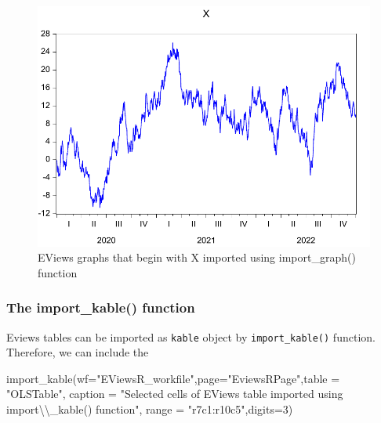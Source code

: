 \documentclass[
  letterpaper,
  DIV=11,
  numbers=noendperiod]{scrartcl}
\newenvironment{Shaded}{\begin{snugshade}}{\end{snugshade}}
\newcommand{\AttributeTok}[1]{\textcolor[rgb]{0.40,0.45,0.13}{#1}}
\newcommand{\DecValTok}[1]{\textcolor[rgb]{0.68,0.00,0.00}{#1}}
\newcommand{\FunctionTok}[1]{\textcolor[rgb]{0.28,0.35,0.67}{#1}}
\newcommand{\NormalTok}[1]{\textcolor[rgb]{0.00,0.23,0.31}{#1}}
\newcommand{\SpecialCharTok}[1]{\textcolor[rgb]{0.37,0.37,0.37}{#1}}
\newcommand{\StringTok}[1]{\textcolor[rgb]{0.13,0.47,0.30}{#1}}
\begin{document}
\begin{figure}
\begin{minipage}[t]{0.50\linewidth}
{{\includegraphics{README_files/figure-pdf//fig-importGraph1-eviewspage1-X_GRAPH.pdf}

}

\caption{\label{fig-importGraph1-2}EViews graphs that begin with X
imported using import\_graph() function}

}

\end{minipage}%

\end{figure}

\hypertarget{the-import_kable-function}{%
\subsubsection{The import\_kable()
function}\label{the-import_kable-function}}

Eviews tables can be imported as \texttt{kable} object by
\texttt{import\_kable()} function. Therefore, we can include the

\begin{Shaded}
\begin{Highlighting}[]
\FunctionTok{import\_kable}\NormalTok{(}\AttributeTok{wf=}\StringTok{"EViewsR\_workfile"}\NormalTok{,}\AttributeTok{page=}\StringTok{"EviewsRPage"}\NormalTok{,}\AttributeTok{table =} \StringTok{"OLSTable"}\NormalTok{,}
\AttributeTok{caption =} \StringTok{"Selected cells of EViews table imported using import}\SpecialCharTok{\textbackslash{}\textbackslash{}}\StringTok{\_kable() function"}\NormalTok{,}
\AttributeTok{range =} \StringTok{"r7c1:r10c5"}\NormalTok{,}\AttributeTok{digits=}\DecValTok{3}\NormalTok{)}
\end{Highlighting}
\end{Shaded}
\end{document}
